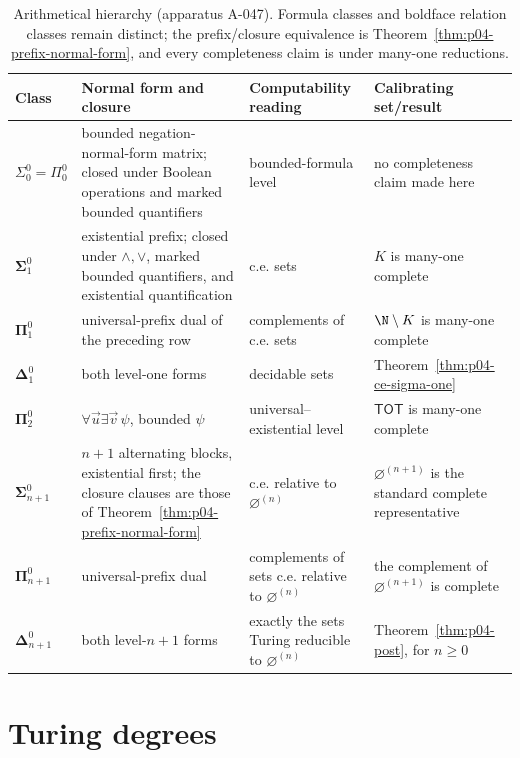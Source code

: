 \begin{table}[htbp]
\centering
\scriptsize
\begin{tabular}{@{}p{.12\linewidth}p{.27\linewidth}p{.24\linewidth}p{.27\linewidth}@{}}
\toprule
Class & Normal form and closure & Computability reading & Calibrating set/result \\
\midrule
\(\Sigma^0_0=\Pi^0_0\) & bounded negation-normal-form matrix; closed under
Boolean operations and marked bounded quantifiers & bounded-formula level & no
completeness claim made here \\
\(\boldsymbol\Sigma^0_1\) & existential prefix; closed under
\(\land,\lor\), marked bounded quantifiers, and existential quantification &
c.e. sets & \(K\) is many-one complete \\
\(\boldsymbol\Pi^0_1\) & universal-prefix dual of the preceding row &
complements of c.e. sets & \(\N\setminus K\) is many-one complete \\
\(\boldsymbol\Delta^0_1\) & both level-one forms & decidable sets &
Theorem~\ref{thm:p04-ce-sigma-one} \\
\(\boldsymbol\Pi^0_2\) & \(\forall\vec u\exists\vec v\,\psi\), bounded
\(\psi\) & universal--existential level & \(\mathsf{TOT}\) is many-one
complete \\
\(\boldsymbol\Sigma^0_{n+1}\) & \(n+1\) alternating blocks, existential
first; the closure clauses are those of
Theorem~\ref{thm:p04-prefix-normal-form} & c.e. relative to
\(\varnothing^{(n)}\) & \(\varnothing^{(n+1)}\) is the standard complete
representative \cite{Shoenfield1967} \\
\(\boldsymbol\Pi^0_{n+1}\) & universal-prefix dual & complements of sets c.e.
relative to \(\varnothing^{(n)}\) & the complement of
\(\varnothing^{(n+1)}\) is complete \cite{Shoenfield1967} \\
\(\boldsymbol\Delta^0_{n+1}\) & both level-\(n+1\) forms & exactly the sets
Turing reducible to \(\varnothing^{(n)}\) &
Theorem~\ref{thm:p04-post}, for \(n\geq0\) \\
\bottomrule
\end{tabular}
\caption{Arithmetical hierarchy (apparatus A-047).  Formula classes and
boldface relation classes remain distinct; the prefix/closure equivalence is
Theorem~\ref{thm:p04-prefix-normal-form}, and every completeness claim is
under many-one reductions.}
\label{tab:p04-arithmetical-hierarchy}
\end{table}

\section{Turing degrees}
\label{sec:p04-turing-degrees}

